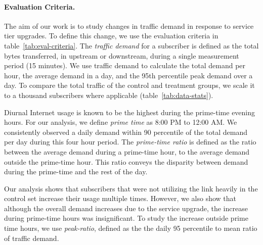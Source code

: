 \paragraph{Evaluation Criteria. } The aim of our work is to study changes in
traffic demand in response to service tier upgrades. To define this change, we 
use the evaluation criteria in table~\ref{tab:eval-criteria}. The \emph{traffic 
demand} for a subscriber is defined as the total bytes transferred, in 
upstream or downstream, during a single measurement period (15 minutes).
We use traffic demand to calculate the total demand per hour, the average demand 
in a day, and the 95th percentile peak demand over a day. To compare the total
traffic of the control and treatment groups, we scale it to a thousand subscribers where
applicable (table~\ref{tab:data-stats}).

Diurnal Internet usage is known to be the highest during the prime-time evening 
hours. For our analysis, we define \emph{prime time} as 8:00 PM to 12:00 AM.
We consistently observed a daily demand within 90 percentile of the 
total demand per day during this four hour period. The \emph{prime-time ratio} is 
defined as the ratio between the average demand during a prime-time hour, 
to the average demand outside the prime-time hour. This ratio conveys the
disparity between demand during the prime-time and the rest of the day.

Our analysis shows that subscribers that were not utilizing the link 
heavily in the control set increase their usage multiple times. However,
we also show that although the overall demand increases due to the 
service upgrade, the increase during prime-time hours was insignificant. 
To study the increase outside prime time hours, we use \emph{peak-ratio},
defined as the the daily 95 percentile to mean ratio of traffic demand.







%